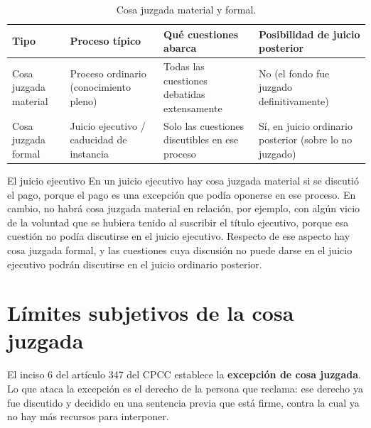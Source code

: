 \documentclass[12pt,oneside]{book}
\renewcommand{\arraystretch}{1.15}
\begin{document}
\begin{table}[H]
\centering
\small
\renewcommand{\arraystretch}{1.25}
\begin{tabularx}{\textwidth}{
    >{\raggedright\arraybackslash}p{2.6cm}
    >{\raggedright\arraybackslash}p{3.0cm}
    >{\raggedright\arraybackslash}X
    >{\raggedright\arraybackslash}X
}
\toprule
\textbf{Tipo} &
\textbf{Proceso típico} &
\textbf{Qué cuestiones abarca} &
\textbf{Posibilidad de juicio posterior} \\
\midrule
Cosa juzgada material & Proceso ordinario (conocimiento pleno) & Todas las cuestiones debatidas extensamente & No (el fondo fue juzgado definitivamente) \\
Cosa juzgada formal & Juicio ejecutivo / caducidad de instancia & Solo las cuestiones discutibles en ese proceso & Sí, en juicio ordinario posterior (sobre lo no juzgado) \\
\bottomrule
\end{tabularx}
\caption{Cosa juzgada material y formal.}
\end{table}

\begin{example}{El juicio ejecutivo}
En un juicio ejecutivo hay cosa juzgada material si se discutió el pago, porque el pago es una excepción que podía oponerse en ese proceso. En cambio, no habrá cosa juzgada material en relación, por ejemplo, con algún vicio de la voluntad que se hubiera tenido al suscribir el título ejecutivo, porque esa cuestión no podía discutirse en el juicio ejecutivo. Respecto de ese aspecto hay cosa juzgada formal, y las cuestiones cuya discusión no puede darse en el juicio ejecutivo podrán discutirse en el juicio ordinario posterior.
\end{example}

\section{Límites subjetivos de la cosa juzgada}

El inciso 6\textordmasculine{} del artículo 347 del CPCC establece la \textbf{excepción de cosa juzgada}. Lo que ataca la excepción es el derecho de la persona que reclama: ese derecho ya fue discutido y decidido en una sentencia previa que está firme, contra la cual ya no hay más recursos para interponer.
\end{document}
